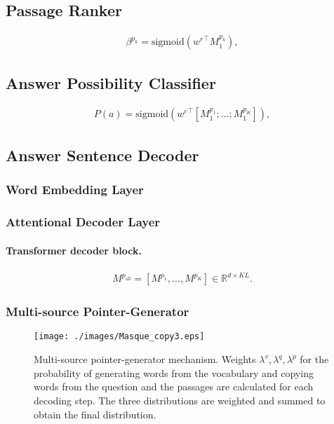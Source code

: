 \documentclass[11pt,a4paper]{article}
\theoremstyle{mydef}
\theoremstyle{myprob}
\begin{document}
\subsection{Passage Ranker}

\begin{align}
\beta^{p_k} = \mathrm{sigmoid}({w^r}^\top M^{p_k}_1),
\end{align}

\subsection{Answer Possibility Classifier}

\begin{align}
P(a) = \mathrm{sigmoid}({w^c}^\top [M^{p_1}_1; \ldots; M^{p_K}_1]),
\end{align}

\subsection{Answer Sentence Decoder}

\subsubsection{Word Embedding Layer}

\subsubsection{Attentional Decoder Layer}

\paragraph{Transformer decoder block.}

\begin{align}
M^{p_\mathrm{all}} = [M^{p_1}, \ldots, M^{p_K}] \in \mathbb{R}^{d \times KL}.
\end{align}

\subsubsection{Multi-source Pointer-Generator}

\begin{figure}[t!]
\centering
\texttt{[image: ./images/Masque\_copy3.eps]}
\caption{Multi-source pointer-generator mechanism. Weights $\lambda^v, \lambda^q, \lambda^p$ for the probability of generating words from the vocabulary and copying words from the question and the passages are calculated for each decoding step. The three distributions are weighted and summed to obtain the final distribution.}
\label{fig:copy}
\end{figure}
\end{document}
